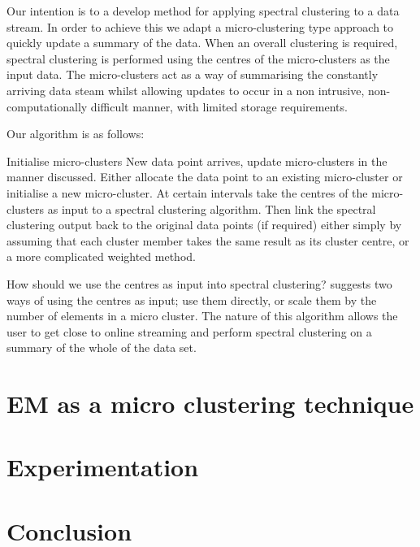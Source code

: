 \documentclass[12pt]{report}		%
\begin{document}
Our intention is to a develop method for applying spectral clustering to a data stream. In order to achieve this we adapt a micro-clustering type approach to quickly update a summary of the data. When an overall clustering is required, spectral clustering is performed using the centres of the micro-clusters as the input data. The micro-clusters act as a way of summarising the constantly arriving data steam whilst allowing updates to occur in a non intrusive, non-computationally difficult manner, with limited storage requirements. 

Our algorithm is as follows: 

\begin{algorithm}
\caption{}  
\begin{algorithmic}
\STATE  Initialise micro-clusters
\STATE New data point arrives, update micro-clusters in the manner discussed. Either allocate the data point to an existing micro-cluster or initialise a new micro-cluster. 
\STATE At certain intervals take the centres of the micro-clusters as input to a spectral clustering algorithm. 
\STATE Then link the spectral clustering output back to the original data points (if required) either simply by assuming that each cluster member takes the same result as its cluster centre, or a more complicated weighted method. 
\end{algorithmic}
\end{algorithm}

How should we use the centres as input into spectral clustering? \cite{Silva2013} suggests two ways of using the centres as input; use them directly, or scale them by the number of elements in a micro cluster. The nature of this algorithm allows the user to get close to online streaming and perform spectral clustering on a summary of the whole of the data set.


\section{EM as a micro clustering technique}

\section{Experimentation}
 \label{sec:clust_study}

\section{Conclusion}
\end{document}
